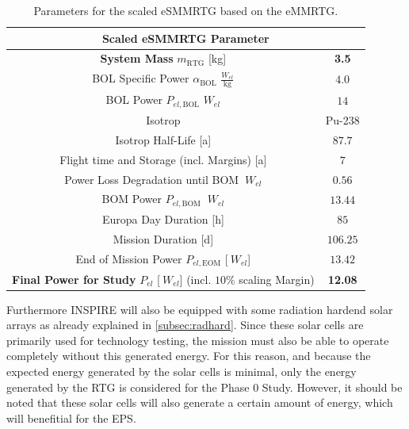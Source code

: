 \begin{table}[H]
\centering
\caption{Parameters for the scaled eSMMRTG based on the eMMRTG.}
\begin{tabular}{|c|c|}
\hline
\multicolumn{2}{|c|}{Scaled eSMMRTG Parameter}                \\ \hline
\textbf{System Mass} $m_\text{RTG}$ [kg]                             & \textbf{3.5}     \\ \hline
BOL Specific Power $\alpha_\text{BOL}$ $\frac{W_{el}}{\text{kg}}$  & $4.0$     \\ \hline
BOL Power $P_{el,\text{BOL}}$ $ W_{el}$                    & $14$       \\ \hline
Isotrop                                                     & Pu-238   \\ \hline
Isotrop Half-Life [a]                                       & $87.7$     \\ \hline
Flight time and Storage (incl. Margins) [a]                 & $7$        \\ \hline
Power Loss Degradation until BOM $\ W_{el}$                 & $0.56$     \\ \hline
BOM Power $P_{el,\text{BOM}}$ $\ W_{el}$                    & $13.44$    \\ \hline
Europa Day Duration [h]                                     & $85$       \\ \hline
Mission Duration [d]                                        & $106.25$   \\ \hline
End of Mission Power $P_{el,\text{EOM}}$ [$\ W_{el}$]         & $13.42$   \\ \hline
\textbf{Final Power for Study} $P_{el}$ [$\ W_{el}$] (incl. $10\%$ scaling Margin) & \textbf{12.08}    \\ \hline
\end{tabular}
\label{tab:esmmrtg}
\end{table}

Furthermore INSPIRE will also be equipped with some radiation hardend solar arrays as already explained in \autoref{subsec:radhard}\cite{FraunhoferInstituteforSolarEnergySystemsISE.2021}. Since these solar cells are primarily used for technology testing, the mission must also be able to operate completely without this generated energy. For this reason, and because the expected energy generated by the solar cells is minimal, only the energy generated by the RTG is considered for the Phase 0 Study. However, it should be noted that these solar cells will also generate a certain amount of energy, which will benefitial for the EPS.


